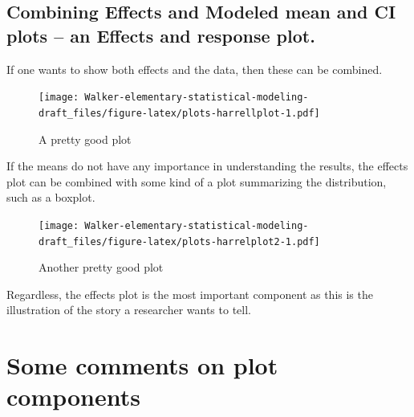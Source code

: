 \documentclass[]{book}
\begin{document}
\hypertarget{combining-effects-and-modeled-mean-and-ci-plots-an-effects-and-response-plot.}{%
\subsection{Combining Effects and Modeled mean and CI plots -- an Effects and response plot.}\label{combining-effects-and-modeled-mean-and-ci-plots-an-effects-and-response-plot.}}

If one wants to show both effects and the data, then these can be combined.

\begin{figure}
\centering
\texttt{[image: Walker-elementary-statistical-modeling-draft\_files/figure-latex/plots-harrellplot-1.pdf]}
\caption{\label{fig:plots-harrellplot}A pretty good plot}
\end{figure}

If the means do not have any importance in understanding the results, the effects plot can be combined with some kind of a plot summarizing the distribution, such as a boxplot.

\begin{figure}
\centering
\texttt{[image: Walker-elementary-statistical-modeling-draft\_files/figure-latex/plots-harrelplot2-1.pdf]}
\caption{\label{fig:plots-harrelplot2}Another pretty good plot}
\end{figure}

Regardless, the effects plot is the most important component as this is the illustration of the story a researcher wants to tell.

\hypertarget{some-comments-on-plot-components}{%
\section{Some comments on plot components}\label{some-comments-on-plot-components}}
\end{document}
